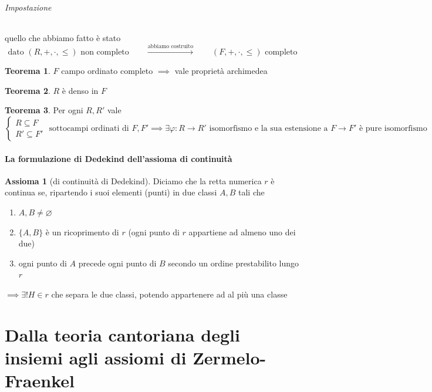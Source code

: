 \documentclass[a4paper,10pt]{article}
\theoremstyle{definition}
\theoremstyle{indentdefinition}
\theoremstyle{indentpostulate}
\newtheorem{axiom}{Assioma}[section]
\theoremstyle{indenttheorem}
\newtheorem{thm}{Teorema}[section]
\theoremstyle{myremark}
\theoremstyle{indentgeneral}
\begin{document}
\paragraph{Impostazione} quello che abbiamo fatto è stato
$$\text{dato }(R,+,\cdot,\le) \text{ non completo}\qquad \overset{\text{abbiamo costruito}}{\longrightarrow}\qquad (F,+,\cdot,\le) \text{ completo}$$

\begin{thm}
    $F$ campo ordinato completo $\implies$ vale proprietà archimedea
\end{thm}

\begin{thm}
    $R$ è denso in $F$
\end{thm}

\begin{thm}
    Per ogni $R,R'$ vale
    $$\begin{cases}
        R\subseteq F \\
        R'\subseteq F'
    \end{cases}\text{ sottocampi ordinati di $F,F'$}\implies \exists\varphi: R\to R'\text{ isomorfismo e la sua estensione a $F\to F'$ è pure isomorfismo}$$
\end{thm}

\subsection{La formulazione di Dedekind dell’assioma di continuità}
\begin{axiom}[di continuità di Dedekind]
    Diciamo che la retta numerica $r$ è continua se, ripartendo i suoi elementi (punti) in due classi $A,B$ tali che 
    \begin{enumerate}
        \item $A,B\ne\varnothing$
        \item $\{A,B\}$ è un ricoprimento di $r$ (ogni punto di $r$ appartiene ad almeno uno dei due)
        \item ogni punto di $A$ precede ogni punto di $B$ secondo un ordine prestabilito lungo $r$
    \end{enumerate}
$\implies\exists!H\in r$ che separa le due classi, potendo appartenere ad al più una classe
\end{axiom}

\pagebreak{}
\part{Dalla teoria cantoriana degli insiemi agli assiomi di Zermelo-Fraenkel}
\end{document}
